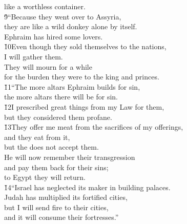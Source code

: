 \begin{poetry}
\poemlll       like a worthless container. \\
\poeml \v{9}``Because they went over to Assyria, \\
\poemll    they are like a wild donkey alone by itself. \\
\poemlll       Ephraim has hired some lovers. \\
\poeml \v{10}Even though they sold themselves to the nations, \\
\poemll    I will gather them. \\
\poeml They will mourn for a while \\
\poemll    for the burden they were to the king and princes. \\
\poeml \v{11}``The more altars Ephraim builds for sin, \\
\poemll    the more altars there will be for sin. \\
\poeml \v{12}I prescribed great things from my Law for them, \\
\poemll    but they considered them profane. \\
\poeml \v{13}They offer me meat from the sacrifices of my offerings, \\
\poemll    and they eat from it, \\
\poemlll       but the  does not accept them. \\
\poeml He will now remember their transgression \\
\poemll    and pay them back for their sins; \\
\poemlll       to Egypt they will return. \\
\poeml \v{14}``Israel has neglected its maker in building palaces. \\
\poemll    Judah has multiplied its fortified cities, \\
\poeml but I will send fire to their cities, \\
\poemll    and it will consume their fortresses.''
\end{poetry}

